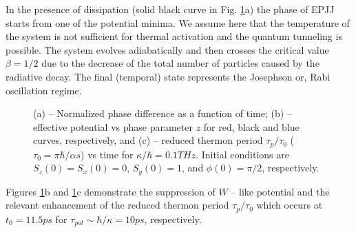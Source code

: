 \documentclass[aps, pre, preprint, groupedaddress, superscriptaddress, showkeys, showpacs] {revtex4-1}
\begin{document}
In the presence of dissipation (solid black curve in Fig. \ref{pic:phase}a) the phase of EPJJ starts from one of the potential minima.
We assume here that the temperature of the system is not sufficient for thermal activation and the quantum tunneling is possible. The system evolves adiabatically and then  crosses the critical value $\beta = 1/2$
due to the decrease of the total number of particles caused by the radiative decay.
The final (temporal) state represents the Josephson or, Rabi oscillation regime.
%
\begin{figure}[ht]
\caption{(a) -- Normalized phase difference as a function of time; (b) -- effective potential vs phase parameter $z$ for red, black and blue curves, respectively, and (c) -- reduced thermon period $\tau_{p} / \tau_0$ ($\tau_0 = \pi \hbar / \alpha s $) vs time for $\kappa/\hbar = 0.1 THz$. 
Initial conditions are $S_z(0) = S_x(0) = 0$, $S_y(0) = 1$, and $\phi(0) = \pi / 2$, respectively.
\label{pic:phase}}
\end{figure}
%

Figures \ref{pic:phase}b and \ref{pic:phase}c demonstrate the suppression of $W$ -- like potential and the relevant enhancement of the reduced thermon period $\tau_{p} / \tau_0$ which occurs at $t_0 = 11.5 ps$ for  $\tau_{pol} \sim \hbar/\kappa= 10 ps$, respectively.
\end{document}

